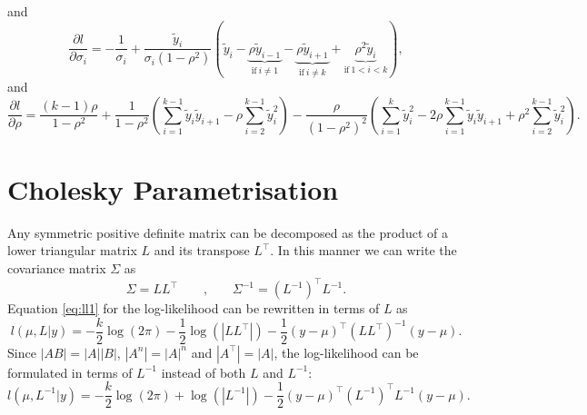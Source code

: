 \documentclass{article}
\begin{document}
%
and
%
\begin{equation}
  \frac{\partial l}{\partial \sigma_i} = - \frac{1}{\sigma_i} + \frac{\tilde{y}_i}{\sigma_i(1-\rho^2)}
  \left( \tilde{y}_i
         - \underbrace{\rho\tilde{y}_{i-1}}_{\text{if} \: i \neq 1}
         - \underbrace{\rho\tilde{y}_{i+1}}_{\text{if} \: i \neq k}
         + \underbrace{\rho^2\tilde{y}_i}_{\text{if} \: 1 < i < k}
  \right),
\end{equation}
%
and
%
\begin{equation}
  \frac{\partial l}{\partial \rho}
  = \frac{(k-1)\rho}{1-\rho^2}
  + \frac{1}{1-\rho^2} \left( \sum_{i=1}^{k-1} \tilde{y}_i \tilde{y}_{i+1} - \rho \sum_{i=2}^{k-1} \tilde{y}_i^2  \right)
  - \frac{\rho}{(1-\rho^2)^2} \left( \sum_{i=1}^{k} \tilde{y}_i^2 - 2\rho \sum_{i=1}^{k-1} \tilde{y}_i \tilde{y}_{i+1} + \rho^2 \sum_{i=2}^{k-1} \tilde{y}_i^2 \right).
\end{equation}


\newpage
\section{Cholesky Parametrisation}

Any symmetric positive definite matrix can be decomposed as the product of a
lower triangular matrix $L$ and its transpose $L^\top$. In this manner 
we can write the covariance matrix $\Sigma$ as
%
\begin{equation}
 \Sigma = L L^\top
 \qquad \text{,} \qquad
 \Sigma^{-1} = (L^{-1})^\top L^{-1}.
\end{equation}
%
Equation \ref{eq:ll1} for the log-likelihood can be rewritten in terms of $L$ as 
%
\begin{equation}
 l(\mu, L|y) = -\frac{k}{2}\log(2\pi) - \frac{1}{2}\log(|L L^\top|) - \frac{1}{2} (y-\mu)^\top 
	(L L^\top)^{-1} (y-\mu).
 \label{eq:ll_chol}
\end{equation}
%
Since $|A B| = |A| |B|$, $|A^n| = |A|^n$ and $|A^\top| = |A|$, the 
log-likelihood can be formulated in terms of $L^{-1}$ instead of 
both $L$ and $L^{-1}$:
%
\begin{equation}
	l(\mu, L^{-1}|y) = -\frac{k}{2}\log(2\pi) + \log(|L^{-1}|) 
	- \frac{1}{2} (y-\mu)^\top (L^{-1})^\top L^{-1} (y-\mu).
 \label{eq:ll_choles}
\end{equation}
%
\end{document}
